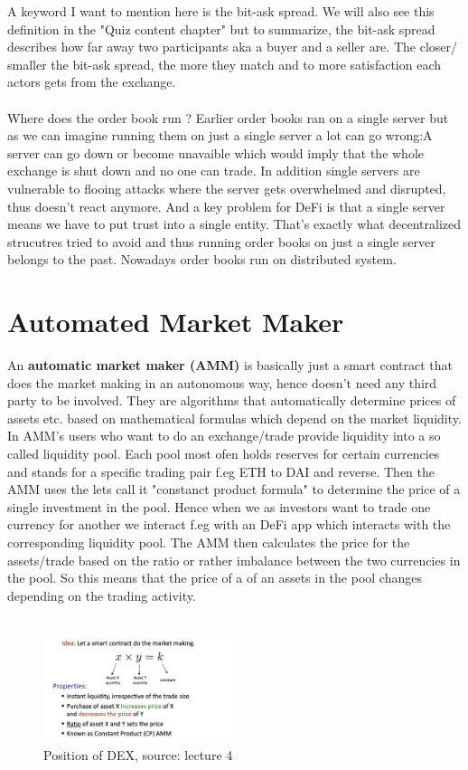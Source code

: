 \documentclass{article}
\begin{document}
A keyword I want to mention here is the bit-ask spread. We will also see this definition in the "Quiz content chapter" but to summarize, the bit-ask spread describes how far away two participants aka a buyer and a seller are. The closer/ smaller the bit-ask spread, the more they match and to more satisfaction each actors gets from the exchange.\\
\\
Where does the order book run ? Earlier order books ran on a single server but as we can imagine running them on just a single server a lot can go wrong:A server can go down or become unavaible which would imply that the whole exchange is shut down and no one can trade. In addition single servers are vulnerable to flooing attacks where the server gets overwhelmed and disrupted, thus doesn't react anymore. And a key problem for DeFi is that a single server means we have to put trust into a single entity. That's exactly what decentralized strucutres tried to avoid and thus running order books on just a single server belongs to the past. Nowadays order books run on distributed system.

\section{Automated Market Maker}
An \textbf{automatic market maker (AMM)} is basically just a smart contract that does the market making in an autonomous way, hence doesn't need any third party to be involved. They are algorithms that automatically determine prices of assets etc. based on mathematical formulas which depend on the market liquidity. In AMM's users who want to do an exchange/trade provide liquidity into a so called liquidity pool. Each pool most ofen holds reserves for certain currencies and stands for a specific trading pair f.eg ETH to DAI and reverse. Then the AMM uses the lets call it "constanct product formula" to determine the price of a single investment in the pool. Hence when we as investors want to trade one currency for another we interact f.eg with an DeFi app which interacts with the corresponding liquidity pool. The AMM then calculates the price for the assets/trade based on the ratio or rather imbalance between the two currencies in the pool. So this means that the price of a of an assets in the pool changes depending on the trading activity.\\
\\
\begin{figure}[h]
    \centering
    \includegraphics[width=0.5\textwidth]{Bildschirmfoto 2024-04-02 um 15.09.34.png} %
    \caption{Position of DEX, \scriptsize{source: lecture 4}}
    \label{fig:DoS-attack}
\end{figure}
\\
\end{document}
